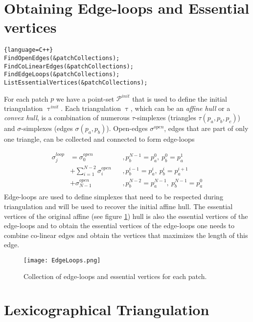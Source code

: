 \documentclass[11pt,letterpaper,titlepage]{article}
\begin{document}
\newpage
\section{Obtaining Edge-loops and Essential vertices}
\begin{lstlisting}{language=C++}
FindOpenEdges(&patchCollections);
FindCoLinearEdges(&patchCollections);
FindEdgeLoops(&patchCollections);
ListEssentialVertices(&patchCollections);
\end{lstlisting}
For each patch $p$ we have a point-set $\mathcal{P}^{init}$ that is used to define the initial triangulation $\uptau^{init}$. Each triangulation $\uptau$, which can be an \textit{affine hull} or a \textit{convex hull}, is a combination of numerous $\tau$-simplexes (triangles $\tau(p_a,p_b,p_c)$) and $\sigma$-simplexes (edges $\sigma(p_a,p_b)$). Open-edges $\sigma^{open}$, edges that are part of only one triangle, can be collected and connected to form edge-loops

\begin{equation*}
\begin{aligned}
\sigma_j^{loop} 
&=\sigma_0^{open}  &&,p_b^{N-1}=p_a^0, \ p_b^0=p_a^1 \\
&+\sum_{i=1}^{N-2} \sigma_i^{open} &&,p_b^{i-1} = p_a^{i}, \ p_b^i = p_a^{i+1} \\
&+\sigma_{N-1}^{open}  &&,p_b^{N-2}=p_a^{N-1}, \ p_b^{N-1}=p_a^0 \\
\end{aligned}
\end{equation*}
\newline
\noindent Edge-loops are used to define simplexes that need to be respected during triangulation and will be used to recover the initial affine hull. The essential vertices of the original affine (see figure \ref{fig:EdgeLoops}) hull is also the essential vertices of the edge-loops and to obtain the essential vertices of the edge-loops one needs to combine co-linear edges and obtain the vertices that maximizes the length of this edge.

\begin{figure}[h]
    \centering
    \texttt{[image: EdgeLoops.png]}
    \caption{Collection of edge-loops and essential vertices for each patch.}
    \label{fig:EdgeLoops}
\end{figure}


\newpage 
{}
\section{Lexicographical Triangulation}
\end{document}
